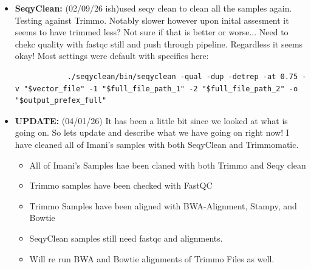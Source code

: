 \documentclass{article}
\begin{document}
\begin{itemize}
\begin{enumerate}
            \item BWA-MEMs
                BWA-Mems was slower than bowtie but initial checks seemed quite acceptable.   Need to qc more though!
                Settings were all default: 
                \begin{verbatim}
                    ./bwa-mem2-2.2.1_x64-linux/bwa-mem2 mem -o "$sam_save_file" -t "$number_of_threads" -v 3 "$reference_index_path" "$first_file" "$second_file"
                \end{verbatim}
            \item Stampy
                Stampy aligned VERY slowly.   About a day for all the paired alignments.   That being said, I did not enable the speed up BWA co-alignment feature which should increase speed significantly but may decrease accuracy.   I also didn't multithread it much so that also impacted speed.
                Settings were default but set to very sensitive.
                \begin{verbatim}
                    conda run -n $conda_environ ./stampy/stampy.py -g near_complete -h near_complete -t $number_of_threads --sensitive -o "$sam_save_file" -M "$first_file" "$second_file" 
                \end{verbatim}
        \end{enumerate}

        \item \textbf{SeqyClean:} (02/09/26 ish)used seqy clean to clean all the samples again.  Testing against Trimmo.   Notably slower however upon inital assesment it seems to have trimmed less?  Not sure if that is better or worse...   Need to chekc quality with fastqc still and push through pipeline.  Regardless it seems okay!
        Most settings were default with specifics here:
        \begin{verbatim}
            ./seqyclean/bin/seqyclean -qual -dup -detrep -at 0.75 -v "$vector_file" -1 "$full_file_path_1" -2 "$full_file_path_2" -o "$output_prefex_full" 
        \end{verbatim}


        \item \textbf{UPDATE:} (04/01/26) It has been a little bit since we looked at what is going on.   So lets update and describe what we have going on right now!  I have cleaned all of Imani's samples with both SeqyClean and Trimmomatic.   
        \begin{itemize}
            \item All of Imani's Samples hae been claned with both Trimmo and Seqy clean
            \item Trimmo samples have been checked with FastQC
            \item Trimmo Samples have been aligned with BWA-Alignment, Stampy, and Bowtie
            \item SeqyClean samples still need fastqc and alignments.
            \item Will re run BWA and Bowtie alignments of Trimmo Files as well.
        \end{itemize}


\end{itemize}
\end{document}
